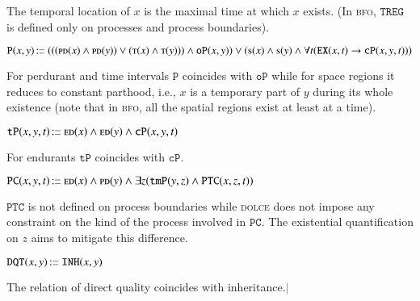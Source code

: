 \documentclass[ao]{iosart2x}
\newcommand{\nb}[1]{\textcolor{red}{$|$}\marginpar{\hspace*{-0cm}\parbox{20mm}{\scriptsize\raggedright\textcolor{red}{#1}}}}
\newcommand{\bfoAxLabel}{\textrm{a$_\texttt{b}$}}
\newcommand{\bdDefLabel}{\textrm{d$_\texttt{bd}$}}
\newcounter{cntbddf}
\newcommand{\bddf}[1]{\refstepcounter{cntbddf}\begin{small}{\bf \bdDefLabel\thecntbddf\label{#1}}\end{small}}
\newcommand{\refbfoax}[1]{({\bfoAxLabel}\ref{#1})}
\newcommand{\refbddf}[1]{({\bdDefLabel}\ref{#1})}
\newcommand{\pr}[1]{\mathtt{#1}}
\newcommand\textequal{%
 \rule[.08ex]{5pt}{0.35pt}\llap{\rule[.78ex]{5pt}{0.35pt}}}
\newcommand{\sdef}{{\hspace{1.5pt}:\hspace{-2.5pt}\textequal\hspace{3pt}}}
\newcommand{\dolce}{{\textsc{dolce}}}
\newcommand{\bfo}{{\textsc{bfo}}}
\newcommand {\EDdcat} {\textsc{ed}}
\newcommand {\PDdcat} {\textsc{pd}}
\newcommand {\PRdcat} {\textsc{pr}}
\newcommand {\Sdcat} {\textsc{s}}
\newcommand {\Tdcat} {\textsc{t}}
\newcommand {\TPd} {\ensuremath{\pr{tP}}}
\newcommand {\Pd} {\ensuremath{\pr{P}}}
\newcommand {\DQTd} {\ensuremath{\pr{DQT}}}
\newcommand {\PCd} {\ensuremath{\pr{PC}}}
\newcommand{\bfoisa}{\pr{ISA}}
\newcommand{\bfocpart}{\pr{cP}}
\newcommand{\bfoopart}{\pr{oP}}
\newcommand{\bfotpart}{\pr{tmP}}
\newcommand{\bfoexist}{\pr{EX}}
\newcommand{\bfoinh}{\pr{INH}}
\newcommand{\bfotregof}{\pr{TREG}}
\newcommand{\bfoparticin}{\pr{PTC}}
\begin{document}
\vspace{1pt}
The temporal location of $x$ is the maximal time at which $x$ exists. (In {\bfo}, $\bfotregof$ is defined only on processes and process boundaries). 


\item[\bddf{b2d_Pd}] $\Pd(x,y)\sdef (((\PDdcat(x) \land \PDdcat(y)) \lor (\Tdcat(x) \land \Tdcat(y))) \land \bfoopart(x,y)) \lor (\Sdcat(x) \land \Sdcat(y) \land \forall t(\bfoexist(x,t) \to \bfocpart(x,y,t)))$

\vspace{1pt}
For perdurant and time intervals $\Pd$ coincides with $\bfoopart$ while for space regions it reduces to constant parthood, i.e., $x$ is a temporary part of $y$ during its whole existence (note that in {\bfo}, all the spatial regions exist at least at a time). 

%
%

\item[\bddf{b2d_TPd}] $\TPd(x,y,t) \sdef \EDdcat(x) \land \EDdcat(y) \land \bfocpart(x,y,t)$

\vspace{1pt}
For endurants $\TPd$ coincides with $\bfocpart$. 

\item[\bddf{b2d_PCd}] $\PCd(x,y,t) \sdef \EDdcat(x) \land \PDdcat(y) \land \exists z(\bfotpart(y,z) \land \bfoparticin(x,z,t))$

\vspace{1pt}
$\bfoparticin$ is not defined on process boundaries while {\dolce} does not impose any constraint on the kind of the process involved in $\PCd$. The existential quantification on $z$ aims to mitigate this difference. 


\item[\bddf{b2d_DQTd}] $\DQTd(x,y) \sdef \bfoinh(x,y)$

\vspace{1pt}
The relation of direct quality coincides with inheritance.\nb{SB: aggiunto}
\end{document}
